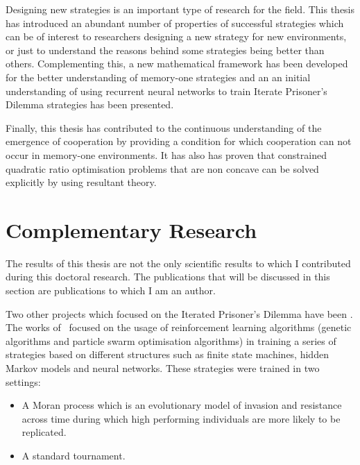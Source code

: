Designing new strategies is an important type of research for the field.
This thesis has introduced an abundant number of properties of successful
strategies which can be of interest to researchers designing a new strategy
for new environments, or just to understand the reasons behind some strategies
being better than others. Complementing this, a new mathematical framework has
been developed for the better understanding of memory-one strategies and an
an initial understanding of using recurrent neural networks to train Iterate Prisoner's
Dilemma strategies has been presented.

Finally, this thesis has contributed to the continuous understanding of the emergence of
cooperation by providing a condition for which cooperation can not occur in
memory-one environments. It has also has proven that constrained quadratic
ratio optimisation problems that are non concave can be solved explicitly by
using resultant theory.


\section{Complementary Research}

The results of this thesis are not the only scientific results to which I
contributed during this doctoral research. The publications that will be
discussed in this section are publications to which I am an author.

Two other projects which focused on the Iterated
Prisoner's Dilemma have been
\cite{Knight2017, Harper2017}. The works of~\cite{Knight2017, Harper2017}
focused on the usage of reinforcement learning algorithms (genetic algorithms
and particle swarm optimisation algorithms) in training a series of strategies
based on different structures such as finite state machines, hidden Markov
models and neural networks. These strategies were trained in two settings:

\begin{itemize}
    \item A Moran process which is an evolutionary model of invasion and
    resistance across time during which high performing individuals are more
    likely to be replicated.
    \item A standard tournament.
\end{itemize}

